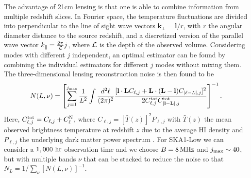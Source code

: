 \documentclass{PoS}
\begin{document}
 The advantage of 21cm lensing is that one is able to combine
information from multiple redshift slices. In Fourier space, the
temperature fluctuations are divided into perpendicular to the line of
sight wave vectors $\mathbf{k_\perp}=\mathbf{l}/r$, with $r$ the angular diameter distance to the source redshift, and a
discretized version of the parallel wave vector $k_\parallel =
\frac{2\pi}{{\cal L}}j$, where ${\cal L}$ is the depth of the observed
volume. Considering modes with different $j$ independent, an optimal
estimator can be found by combining the individual estimators for
different $j$ modes without mixing them. The three-dimensional lensing reconstruction noise is then found to be  \citep{Zahn:2005ap}\begin{equation}
N(L,\nu) =  \left[\sum_{j=1}^{j_{\rm max}} \frac{1}{L^2}\int \frac{d^2\ell}{(2\pi)^2}  \frac{[\mathbf{l} \cdot \mathbf{L} C_{\ell,j}+\mathbf{L} \cdot (\mathbf{L}-\mathbf{l})
C_{|\ell-L|,j}]^2}{2 C^{\rm tot}_{\ell,j}C^{\rm tot}_{|\mathbf{l}-\mathbf{L}|,j}}\right]^{-1}.
\end{equation}
Here, $C^{\rm tot}_{\ell,j}=C_{\ell,j}+C^{\rm N}_\ell$, where $C_{\ell,j}=[\bar{T}(z)]^2P_{\ell,j}$ with $\bar{T}(z)$ the mean observed brightness temperature at redshift $z$ due to the average HI density and $P_{\ell,j}$ the underlying dark matter power spectrum  \citep{Zahn:2005ap}. 
For SKA1-Low we can consider a $1,000~{\rm hr}$ observation time and we choose $B = 8 \, {\rm MHz}$ and $j_{\rm max} \sim 40$, but with multiple bands $\nu$ that can be stacked to reduce the noise so that $N_L = 1/\displaystyle\sum_{\nu} [N(L,\nu)]^{-1}$. 
 
\end{document}
